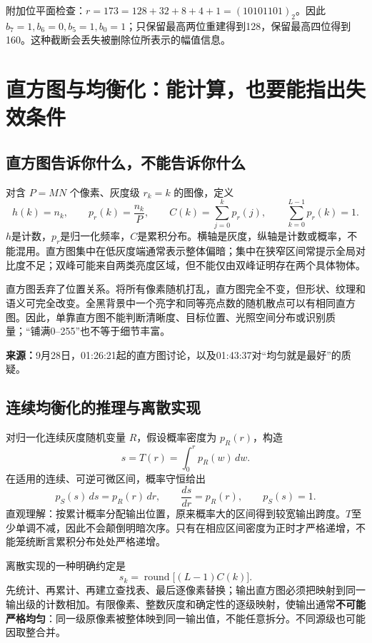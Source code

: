 附加位平面检查：$r=173=128+32+8+4+1=(10101101)_2$。因此 $b_7=1,b_6=0,b_5=1,b_0=1$；只保留最高两位重建得到128，保留最高四位得到160。这种截断会丢失被删除位所表示的幅值信息。

\section{直方图与均衡化：能计算，也要能指出失效条件}
\subsection{直方图告诉你什么，不能告诉你什么}
对含 $P=MN$ 个像素、灰度级 $r_k=k$ 的图像，定义
\begin{equation}
h(k)=n_k,\qquad p_r(k)=\frac{n_k}{P},\qquad
C(k)=\sum_{j=0}^{k}p_r(j),\qquad \sum_{k=0}^{L-1}p_r(k)=1.
\end{equation}
$h$是计数，$p_r$是归一化频率，$C$是累积分布。横轴是灰度，纵轴是计数或概率，不能混用。直方图集中在低灰度端通常表示整体偏暗；集中在狭窄区间常提示全局对比度不足；双峰可能来自两类亮度区域，但不能仅由双峰证明存在两个具体物体。

直方图丢弃了位置关系。将所有像素随机打乱，直方图完全不变，但形状、纹理和语义可完全改变。全黑背景中一个亮字和同等亮点数的随机散点可以有相同直方图。因此，单靠直方图不能判断清晰度、目标位置、光照空间分布或识别质量；“铺满0--255”也不等于细节丰富。

\noindent\textbf{来源：}9月28日，01:26:21起的直方图讨论，以及01:43:37对“均匀就是最好”的质疑。

\subsection{连续均衡化的推理与离散实现}
对归一化连续灰度随机变量 $R$，假设概率密度为 $p_R(r)$，构造
\begin{equation}
s=T(r)=\int_0^r p_R(w)\,dw.
\end{equation}
在适用的连续、可逆可微区间，概率守恒给出
\[
p_S(s)\,ds=p_R(r)\,dr,\qquad
\frac{ds}{dr}=p_R(r),\qquad p_S(s)=1.
\]
直观理解：按累计概率分配输出位置，原来概率大的区间得到较宽输出跨度。$T$至少单调不减，因此不会颠倒明暗次序。只有在相应区间密度为正时才严格递增，不能笼统断言累积分布处处严格递增。

离散实现的一种明确约定是
\begin{equation}
\boxed{s_k=\operatorname{round}\big[(L-1)C(k)\big].}
\end{equation}
先统计、再累计、再建立查找表、最后逐像素替换；输出直方图必须把映射到同一输出级的计数相加。有限像素、整数灰度和确定性的逐级映射，使输出通常\textbf{不可能严格均匀}：同一级原像素被整体映到同一输出值，不能任意拆分。不同源级也可能因取整合并。


